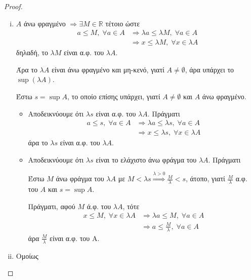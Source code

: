\documentclass[main.tex]{subfiles}
\begin{document}
\begin{proof}
\item {}
    \begin{enumerate}[i)]
        \item $A$ άνω φραγμένο $ \Rightarrow \exists M \in \mathbb{R} $ τέτοιο ώστε
            \begin{align*}
                a \leq M, \; \forall a \in A
                &\Rightarrow \lambda a \leq \lambda M, \; \forall a \in A \\
                & \Rightarrow x \leq \lambda M, \; \forall x \in \lambda A 
            \end{align*}
            δηλαδή, το  $ \lambda M $ είναι α.φ. του $ \lambda A $.

Άρα το $ \lambda A $ είναι άνω φραγμένο και μη-κενό, γιατί $ A \neq \emptyset $, άρα
υπάρχει το $ \sup (\lambda A) $.

Έστω $ s= \sup A $, το οποίο επίσης υπάρχει, γιατί $ A \neq \emptyset $ και $A$ άνω 
φραγμένο. 

\begin{itemize}
    \item Αποδεικνύουμε ότι $ \lambda s $ είναι α.φ. του $ \lambda A $. Πράγματι
        \begin{align*}
        a \leq s, \; \forall a \in A & \Rightarrow \lambda a \leq \lambda s, \; \forall a \in A \\
                                     & \Rightarrow x \leq \lambda s, \; \forall x \in \lambda A
        \end{align*}
        άρα το $ \lambda s $ είναι α.φ. του $ \lambda A $.

    \item Αποδεικνύουμε ότι $ \lambda s $ είναι το ελάχιστο άνω φράγμα του $ \lambda A$.
        Πράγματι 

        Έστω $M$ άνω φράγμα του $ \lambda A $ με $ M < \lambda s \overset{\lambda >0}
        {\Rightarrow} \frac{M}{\lambda} < s  $, άτοπο, γιατί $ \frac{ M}{\lambda} $ 
        α.φ. του $A$ και $ s= \sup A $.

        Πράγματι, αφού $ M $ ά.φ. του $ \lambda A $, τότε
        \begin{align*}
            x \leq M, \; \forall x \in \lambda A 
            &\Rightarrow \lambda a \leq M, \; \forall a \in A \\
            &\Rightarrow a \leq \frac{M}{\lambda}, \; \forall a \in A
         \end{align*} 
         άρα $ \frac{M}{\lambda} $ είναι α.φ. του Α.
\end{itemize}

\item Ομοίως
    \end{enumerate}
\end{proof}
\end{document}
